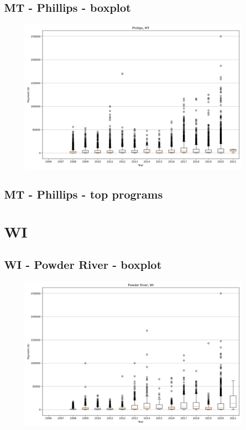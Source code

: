 \subsection*{MT - Phillips - boxplot}
\begin{figure}[h]
\centering
\includegraphics[width=7in]{../output/boxplots/counties/Phillips-MT_boxplot.png}
\end{figure}


\subsection*{MT - Phillips - top programs}

\newpage
\section*{WI}
\subsection*{WI - Powder River - boxplot}
\begin{figure}[h]
\centering
\includegraphics[width=7in]{../output/boxplots/counties/Powder River-WI_boxplot.png}
\end{figure}


